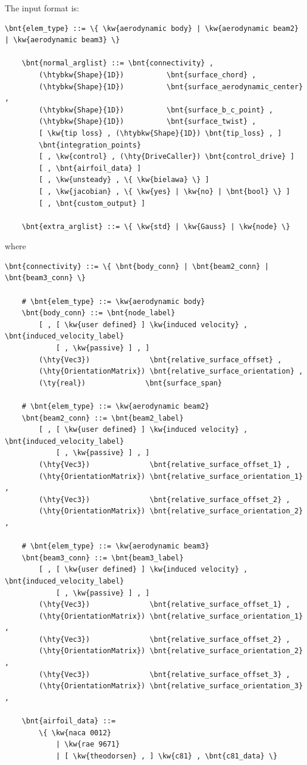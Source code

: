 The input format is:
\begin{Verbatim}[commandchars=\\\{\}]
    \bnt{elem_type} ::= \{ \kw{aerodynamic body} | \kw{aerodynamic beam2} | \kw{aerodynamic beam3} \}

    \bnt{normal_arglist} ::= \bnt{connectivity} ,
        (\htybkw{Shape}{1D})          \bnt{surface_chord} ,
        (\htybkw{Shape}{1D})          \bnt{surface_aerodynamic_center} ,
        (\htybkw{Shape}{1D})          \bnt{surface_b_c_point} ,
        (\htybkw{Shape}{1D})          \bnt{surface_twist} ,
        [ \kw{tip loss} , (\htybkw{Shape}{1D}) \bnt{tip_loss} , ]
        \bnt{integration_points}
        [ , \kw{control} , (\hty{DriveCaller}) \bnt{control_drive} ]
        [ , \bnt{airfoil_data} ]
        [ , \kw{unsteady} , \{ \kw{bielawa} \} ]
        [ , \kw{jacobian} , \{ \kw{yes} | \kw{no} | \bnt{bool} \} ]
        [ , \bnt{custom_output} ]

    \bnt{extra_arglist} ::= \{ \kw{std} | \kw{Gauss} | \kw{node} \}
\end{Verbatim}
where
\begin{Verbatim}[commandchars=\\\{\}]
    \bnt{connectivity} ::= \{ \bnt{body_conn} | \bnt{beam2_conn} | \bnt{beam3_conn} \}

    # \bnt{elem_type} ::= \kw{aerodynamic body}
    \bnt{body_conn} ::= \bnt{node_label}
        [ , [ \kw{user defined} ] \kw{induced velocity} , \bnt{induced_velocity_label}
            [ , \kw{passive} ] , ]
        (\hty{Vec3})              \bnt{relative_surface_offset} ,
        (\hty{OrientationMatrix}) \bnt{relative_surface_orientation} ,
        (\ty{real})              \bnt{surface_span}

    # \bnt{elem_type} ::= \kw{aerodynamic beam2}
    \bnt{beam2_conn} ::= \bnt{beam2_label}
        [ , [ \kw{user defined} ] \kw{induced velocity} , \bnt{induced_velocity_label}
            [ , \kw{passive} ] , ]
        (\hty{Vec3})              \bnt{relative_surface_offset_1} ,
        (\hty{OrientationMatrix}) \bnt{relative_surface_orientation_1} ,
        (\hty{Vec3})              \bnt{relative_surface_offset_2} ,
        (\hty{OrientationMatrix}) \bnt{relative_surface_orientation_2} ,

    # \bnt{elem_type} ::= \kw{aerodynamic beam3}
    \bnt{beam3_conn} ::= \bnt{beam3_label}
        [ , [ \kw{user defined} ] \kw{induced velocity} , \bnt{induced_velocity_label}
            [ , \kw{passive} ] , ]
        (\hty{Vec3})              \bnt{relative_surface_offset_1} ,
        (\hty{OrientationMatrix}) \bnt{relative_surface_orientation_1} ,
        (\hty{Vec3})              \bnt{relative_surface_offset_2} ,
        (\hty{OrientationMatrix}) \bnt{relative_surface_orientation_2} ,
        (\hty{Vec3})              \bnt{relative_surface_offset_3} ,
        (\hty{OrientationMatrix}) \bnt{relative_surface_orientation_3} ,

    \bnt{airfoil_data} ::=
        \{ \kw{naca 0012}
            | \kw{rae 9671}
            | [ \kw{theodorsen} , ] \kw{c81} , \bnt{c81_data} \}
\end{Verbatim}
